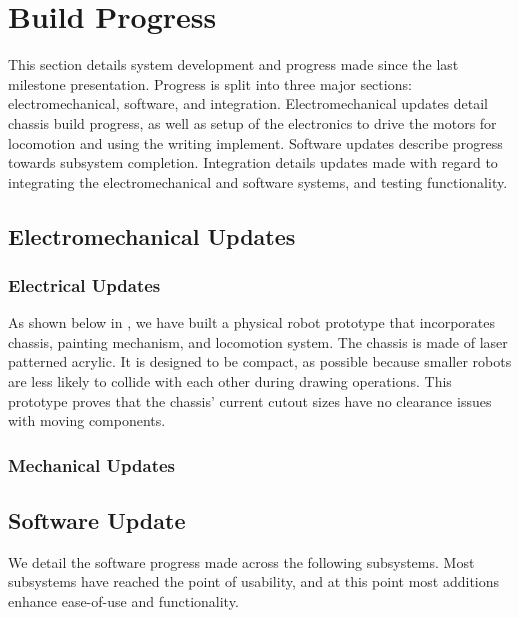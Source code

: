 
\section{Build Progress}
\label{sec:build_progress}

This section details system development and progress made since the last milestone presentation. Progress is split into three major sections: electromechanical, software, and integration. Electromechanical updates detail chassis build progress, as well as setup of the electronics to drive the motors for locomotion and using the writing implement. Software updates describe progress towards subsystem completion. Integration details updates made with regard to integrating the electromechanical and software systems, and testing functionality.

\subsection{Electromechanical Updates}
\label{sec:electromechanical_progress}

\subsubsection{Electrical Updates}
\label{sec:electrical_progress}
As shown below in , we have built a physical robot prototype that incorporates chassis, painting mechanism, and locomotion system. The chassis is made of laser patterned acrylic. It is designed to be compact, as possible because smaller robots are less likely to collide with each other during drawing operations. This prototype proves that the chassis’ current cutout sizes have no clearance issues with moving components. 

\subsubsection{Mechanical Updates}
\label{sec:mechanical_progress}




\subsection{Software Update}
\label{sec:software_progress}
We detail the software progress made across the following subsystems. Most subsystems have reached the point of usability, and at this point most additions enhance ease-of-use and functionality.


